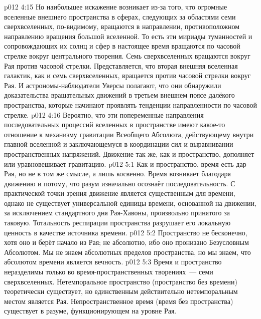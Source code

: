 \vs p012 4:15 Но наибольшее искажение возникает из\hyp{}за того, что огромные вселенные внешнего пространства в сферах, следующих за областями семи сверхвселенных, по\hyp{}видимому, вращаются в направлении, противоположном направлению вращения большой вселенной. То есть эти мириады туманностей и сопровождающих их солнц и сфер в настоящее время вращаются по часовой стрелке вокруг центрального творения. Семь сверхвселенных вращаются вокруг Рая против часовой стрелки. Представляется, что вторая внешняя вселенная галактик, как и семь сверхвселенных, вращается против часовой стрелки вокруг Рая. И астрономы\hyp{}наблюдатели Уверсы полагают, что они обнаружили доказательства вращательных движений в третьем внешнем поясе далёкого пространства, которые начинают проявлять тенденции направленности по часовой стрелке.
\vs p012 4:16 Вероятно, что эти попеременные направления последовательных процессий вселенных в пространстве имеют какое\hyp{}то отношение к механизму гравитации Всеобщего Абсолюта, действующему внутри главной вселенной и заключающемуся в координации сил и выравнивании пространственных напряжений. Движение так же, как и пространство, дополняет или уравновешивает гравитацию.
\vs p012 5:1 Как и пространство, время есть дар Рая, но не в том же смысле, а лишь косвенно. Время возникает благодаря движению и потому, что разум изначально осознаёт последовательность. С практической точки зрения движение является существенным для времени, однако не существует универсальной единицы времени, основанной на движении, за исключением стандартного дня Рая\hyp{}Хавоны, произвольно принятого за таковую. Тотальность респирации пространства разрушает его локальную ценность в качестве источника времени.
\vs p012 5:2 Пространство не бесконечно, хотя оно и берёт начало из Рая; не абсолютно, ибо оно пронизано Безусловным Абсолютом. Мы не знаем абсолютных пределов пространства, но мы знаем, что абсолютом времени является вечность.
\vs p012 5:3 \pc Время и пространство неразделимы только во время\hyp{}пространственных творениях~--- семи сверхвселенных. Нетемпоральное пространство (пространство без времени) теоретически существует, но единственным действительно нетемпоральным местом является  Рая. Непространственное время (время без пространства) существует в разуме, функционирующем на уровне Рая.
